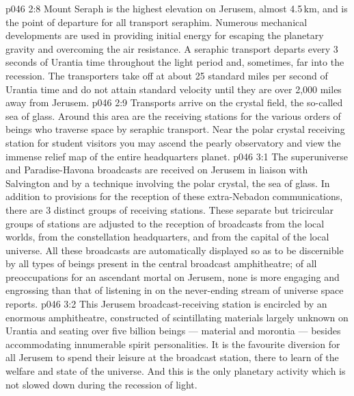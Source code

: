 \vs p046 2:8 \pc Mount Seraph is the highest elevation on Jerusem, almost 4.5\,km, and is the point of departure for all transport seraphim. Numerous mechanical developments are used in providing initial energy for escaping the planetary gravity and overcoming the air resistance. A seraphic transport departs every 3 seconds of Urantia time throughout the light period and, sometimes, far into the recession. The transporters take off at about 25 standard miles per second of Urantia time and do not attain standard velocity until they are over 2,000 miles away from Jerusem.
\vs p046 2:9 Transports arrive on the crystal field, the so\hyp{}called sea of glass. Around this area are the receiving stations for the various orders of beings who traverse space by seraphic transport. Near the polar crystal receiving station for student visitors you may ascend the pearly observatory and view the immense relief map of the entire headquarters planet.
\vs p046 3:1 The superuniverse and Paradise\hyp{}Havona broadcasts are received on Jerusem in liaison with Salvington and by a technique involving the polar crystal, the sea of glass. In addition to provisions for the reception of these extra\hyp{}Nebadon communications, there are 3 distinct groups of receiving stations. These separate but tricircular groups of stations are adjusted to the reception of broadcasts from the local worlds, from the constellation headquarters, and from the capital of the local universe. All these broadcasts are automatically displayed so as to be discernible by all types of beings present in the central broadcast amphitheatre; of all preoccupations for an ascendant mortal on Jerusem, none is more engaging and engrossing than that of listening in on the never\hyp{}ending stream of universe space reports.
\vs p046 3:2 This Jerusem broadcast\hyp{}receiving station is encircled by an enormous amphitheatre, constructed of scintillating materials largely unknown on Urantia and seating over five billion beings --- material and morontia --- besides accommodating innumerable spirit personalities. It is the favourite diversion for all Jerusem to spend their leisure at the broadcast station, there to learn of the welfare and state of the universe. And this is the only planetary activity which is not slowed down during the recession of light.
